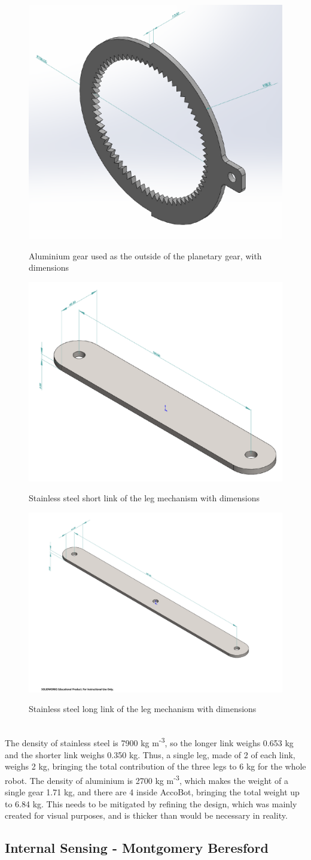 \documentclass[11pt]{article}		%
\newcommand{\supercite}[1]{\textsuperscript{\cite{#1}}}		%
\begin{document}
				\begin{figure}[h]
					\centering
					\begin{multicols}{3}
						\includegraphics[height=0.18\textwidth]{gearCAD}
						\caption{Aluminium gear used as the outside of the planetary gear, with dimensions}
						\label{gearCAD}
						\columnbreak
						\includegraphics[height=0.18\textwidth]{shortLinkCAD}
						\caption{Stainless steel short link of the leg mechanism with dimensions}
						\label{shortLinkCAD}
						\columnbreak
						\includegraphics[height=0.18\textwidth]{longLinkCAD}
						\caption{Stainless steel long link of the leg mechanism with dimensions}
						\label{longLinkCAD}
					\end{multicols}
				\end{figure}
				\\
                \hspace*{2ex}The density of stainless steel is 7900 kg m\textsuperscript{-3}\supercite{HLT}, so the longer link weighs 0.653 kg and the shorter link weighs 0.350 kg.
				Thus, a single leg, made of 2 of each link, weighs 2 kg, bringing the total contribution of the three legs to 6 kg for the whole robot.
				The density of aluminium is 2700 kg m\textsuperscript{-3}\supercite{HLT}, which makes the weight of a single gear 1.71 kg, and there are 4 inside AccoBot, bringing the total weight up to 6.84 kg.
				This needs to be mitigated by refining the design, which was mainly created for visual purposes, and is thicker than would be necessary in reality.
			
		\subsection[Internal Sensing]{Internal Sensing - Montgomery Beresford}
		
\end{document}
